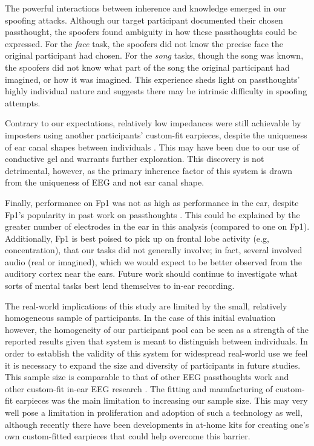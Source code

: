 \documentclass{sigchi}
\begin{document}
The powerful interactions between inherence and knowledge emerged in our spoofing attacks. Although our target participant documented their chosen passthought, the spoofers found ambiguity in how these passthoughts could be expressed. For the \textit{face} task, the spoofers did not know the precise face the original participant had chosen. For the \textit{song} tasks, though the song was known, the spoofers did not know what part of the song the original participant had imagined, or how it was imagined. This experience sheds light on passthoughts' highly individual nature and suggests there may be intrinsic difficulty in spoofing attempts.

Contrary to our expectations, relatively low impedances were still achievable by imposters using another participants' custom-fit earpieces, despite the uniqueness of ear canal shapes between individuals \cite{Akkermans2005}. This may have been due to our use of conductive gel and warrants further exploration. This discovery is not detrimental, however, as the primary inherence factor of this system is drawn from the uniqueness of EEG and not ear canal shape.

Finally, performance on Fp1 was not as high as performance in the ear, despite Fp1's popularity in past work on passthoughts \cite{Chuang2013b}. This could be explained by the greater number of electrodes in the ear in this analysis (compared to one on Fp1). Additionally, Fp1 is best poised to pick up on frontal lobe activity (e.g, concentration), that our tasks did not generally involve; in fact, several involved audio (real or imagined), which we would expect to be better observed from the auditory cortex near the ears. Future work should continue to investigate what sorts of mental tasks best lend themselves to in-ear recording.

The real-world implications of this study are limited by the small, relatively homogeneous sample of participants. In the case of this initial evaluation however, the homogeneity of our participant pool can be seen as a strength of the reported results given that system is meant to distinguish between individuals. In order to establish the validity of this system for widespread real-world use we feel it is necessary to expand the size and diversity of participants in future studies. This sample size is comparable to that of other EEG passthoughts work \cite{Ashby2011, Marcel2007a, Poulos2002, Chuang2013b, curran2016passthoughts} and other custom-fit in-ear EEG research \cite{Kidmose2013a, Mikkelsen2015}. The fitting and manufacturing of custom-fit earpieces was the main limitation to increasing our sample size. This may very well pose a limitation in proliferation and adoption of such a technology as well, although recently there have been developments in at-home kits for creating one's own custom-fitted earpieces \cite{voix2015settable} that could help overcome this barrier.
\end{document}
